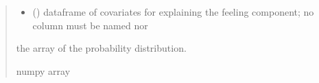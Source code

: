\documentclass[letterpaper,10pt,english]{sphinxmanual}
\begin{document}
\begin{fulllineitems}
\begin{quote}
\begin{description}
\begin{itemize}
\item {} 
\sphinxAtStartPar
{} () \textendash{} dataframe of covariates for explaining the feeling component;
no column must be named  nor 

\end{itemize}

\sphinxAtStartPar
the array of the probability distribution.

\sphinxAtStartPar
numpy array

\end{description}\end{quote}

\end{fulllineitems}

\end{document}
